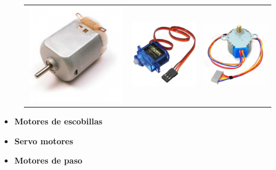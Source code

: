 \documentclass{beamer}
\begin{document}
    \begin{frame}
   		\begin{figure}[h]
   			\centering
   			\begin{tabular}{ccc}
   				\includegraphics[width = 0.3\linewidth]{figures/brushed.jpg} &
   				\includegraphics[width = 0.3\linewidth]{figures/stepper.JPG} & 
   				\includegraphics[width = 0.3\linewidth]{figures/paso.jpg}
   			\end{tabular}
   		\end{figure}
   		
   		\begin{itemize}
   			\item \textbf{Motores de escobillas}
   			\item \textbf{Servo motores} 
   			\item \textbf{Motores de paso}
   		\end{itemize}
    \end{frame}
    
\end{document}
